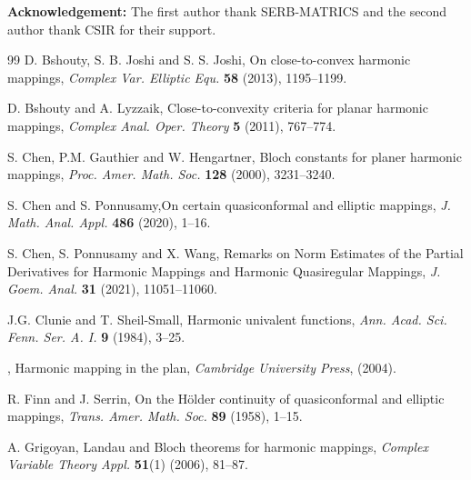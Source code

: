 \documentclass[a4paper,12pt]{amsart}
\theoremstyle{plain}
\theoremstyle{definition}
\begin{document}
\vspace{2mm}


\noindent\textbf{Acknowledgement:}  The first author thank SERB-MATRICS and the second author thank CSIR for their support. 


\begin{thebibliography}{99}
{\sc D. Bshouty}, {\sc S. B. Joshi} and {\sc S. S. Joshi}, On close-to-convex harmonic mappings, {\it Complex Var. Elliptic Equ.} {\bf 58} (2013), 1195--1199.

{\sc D. Bshouty} and {\sc A. Lyzzaik}, Close-to-convexity criteria for planar harmonic mappings, {\it  Complex Anal. Oper. Theory} {\bf 5} (2011), 767--774.
 
   {\sc S. Chen}, {\sc P.M. Gauthier} and {\sc W. Hengartner}, Bloch constants for planer harmonic mappings, {\it Proc. Amer. Math. Soc.} {\bf 128} (2000), 3231--3240. 
 
   {\sc S. Chen } and {\sc S. Ponnusamy},On certain quasiconformal and elliptic mappings, {\it  J. Math. Anal. Appl.} {\bf 486} (2020), 1--16.
 
  
 
   {\sc S. Chen}, {\sc S. Ponnusamy} and {\sc X. Wang}, Remarks on Norm Estimates of the Partial Derivatives for Harmonic Mappings and Harmonic Quasiregular Mappings, {\it  J. Goem. Anal.} {\bf 31} (2021), 11051--11060. 
  
   {\sc J.G. Clunie} and {\sc T. Sheil-Small}, Harmonic univalent functions, {\it  Ann. Acad. Sci. Fenn. Ser. A. I.} {\bf 9} (1984), 3--25. 
  
     , Harmonic mapping in the plan, {\it Cambridge University Press}, (2004).
  
    {\sc R. Finn} and {\sc J. Serrin}, On the H\"{o}lder continuity of quasiconformal and elliptic mappings, {\it  Trans. Amer. Math. Soc.} {\bf 89} (1958), 1--15.

 
   {\sc A. Grigoyan}, Landau and Bloch theorems for harmonic mappings, {\it  Complex Variable Theory Appl.} {\bf 51}(1) (2006), 81--87. 
  

\end{thebibliography}
\end{document}
